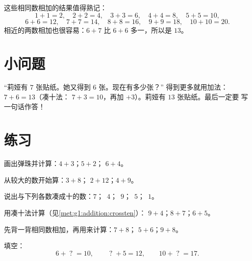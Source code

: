 \begin{example}[相同数相加]\label{ex:g1:addition:doubles}
这些相同数相加的结果值得熟记：
\[
1+1=2, \quad 2+2=4, \quad 3+3=6, \quad 4+4=8, \quad 5+5=10,
\]
\[
6+6=12, \quad 7+7=14, \quad 8+8=16, \quad 9+9=18, \quad 10+10=20 .
\]
相近的两数相加也很容易：$6 + 7$ 比 $6 + 6$ 多一，所以是 $13$。
\end{example}

\section{小问题}

\begin{example}\label{ex:g1:addition:problem}
“莉娅有 $7$ 张贴纸。她又得到 $6$ 张。现在有多少张？”
得到更多就用加法：$7 + 6 = 13$（凑十法：
$7 + 3 = 10$，再加 $+3$）。莉娅有 $13$ 张贴纸。最后一定要
写一句话作答！
\end{example}

\section{练习}

\begin{exercise}[$\star$]\label{exo:g1:addition:1}
画出弹珠并计算：$4 + 3$；\quad $5 + 2$；\quad
$6 + 4$。
\end{exercise}

\begin{exercise}[$\star$]\label{exo:g1:addition:2}
从较大的数开始算：$3 + 8$；\quad
$2 + 12$；\quad $4 + 9$。
\end{exercise}

\begin{exercise}[$\star$]\label{exo:g1:addition:3}
说出与下列各数凑成十的数：$7$；\ $4$；\ $9$；\ $5$；\ $1$。
\end{exercise}

\begin{exercise}[$\star$]\label{exo:g1:addition:4}
用凑十法计算（见\cref{met:g1:addition:crossten}）：
$9 + 4$；\quad $8 + 7$；\quad $6 + 5$。
\end{exercise}

\begin{exercise}[$\star$]\label{exo:g1:addition:5}
先背一背相同数相加，再用来计算：$7 + 8$；\quad
$5 + 6$；\quad $9 + 8$。
\end{exercise}

\begin{exercise}[$\star$]\label{exo:g1:addition:6}
填空：
\[
6 + \;?\; = 10, \qquad
\;?\; + 5 = 12, \qquad
10 + \;?\; = 17 .
\]
\end{exercise}

